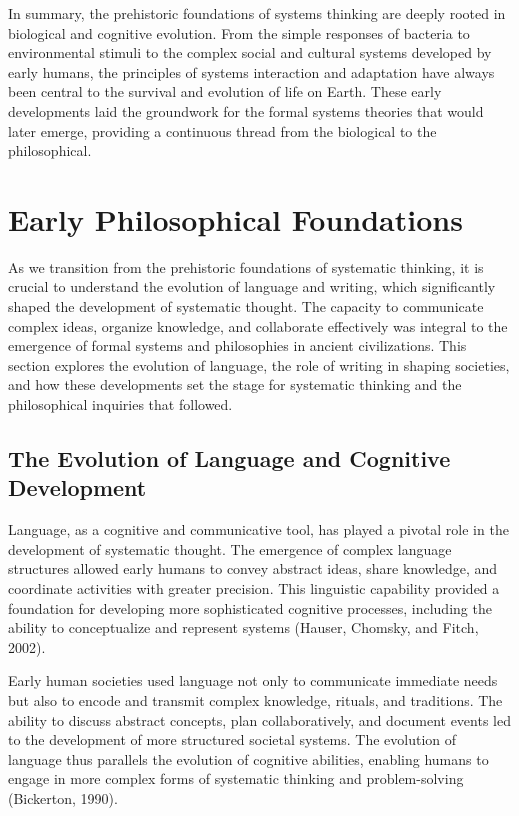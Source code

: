 \documentclass[twocolumn]{article}
\begin{document}
\textcolor{secondary}{In summary, the prehistoric foundations of systems thinking are deeply rooted in biological and cognitive evolution. From the simple responses of bacteria to environmental stimuli to the complex social and cultural systems developed by early humans, the principles of systems interaction and adaptation have always been central to the survival and evolution of life on Earth. These early developments laid the groundwork for the formal systems theories that would later emerge, providing a continuous thread from the biological to the philosophical.}

\section{Early Philosophical Foundations}

\textcolor{primary}{As we transition from the prehistoric foundations of systematic thinking, it is crucial to understand the evolution of language and writing, which significantly shaped the development of systematic thought. The capacity to communicate complex ideas, organize knowledge, and collaborate effectively was integral to the emergence of formal systems and philosophies in ancient civilizations. This section explores the evolution of language, the role of writing in shaping societies, and how these developments set the stage for systematic thinking and the philosophical inquiries that followed.}

\subsection{The Evolution of Language and Cognitive Development}

\textcolor{primary}{Language, as a cognitive and communicative tool, has played a pivotal role in the development of systematic thought. The emergence of complex language structures allowed early humans to convey abstract ideas, share knowledge, and coordinate activities with greater precision. This linguistic capability provided a foundation for developing more sophisticated cognitive processes, including the ability to conceptualize and represent systems (Hauser, Chomsky, and Fitch, 2002).}

\textcolor{secondary}{Early human societies used language not only to communicate immediate needs but also to encode and transmit complex knowledge, rituals, and traditions. The ability to discuss abstract concepts, plan collaboratively, and document events led to the development of more structured societal systems. The evolution of language thus parallels the evolution of cognitive abilities, enabling humans to engage in more complex forms of systematic thinking and problem-solving (Bickerton, 1990).}
\end{document}
